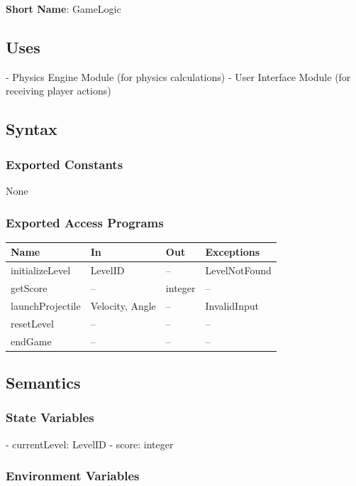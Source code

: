 \documentclass[12pt]{article}
\begin{document}
\textbf{Short Name}: GameLogic

\subsection{Uses}

- Physics Engine Module (for physics calculations)
- User Interface Module (for receiving player actions)

\subsection{Syntax}

\subsubsection{Exported Constants}

None

\subsubsection{Exported Access Programs}

\begin{tabular}{|l|l|l|l|}
\hline
\textbf{Name} & \textbf{In} & \textbf{Out} & \textbf{Exceptions} \\
\hline
initializeLevel & LevelID & -- & LevelNotFound \\
\hline
getScore & -- & integer & -- \\
\hline
launchProjectile & Velocity, Angle & -- & InvalidInput \\
\hline
resetLevel & -- & -- & -- \\
\hline
endGame & -- & -- & -- \\
\hline
\end{tabular}

\subsection{Semantics}

\subsubsection{State Variables}

- currentLevel: LevelID
- score: integer

\subsubsection{Environment Variables}
\end{document}
